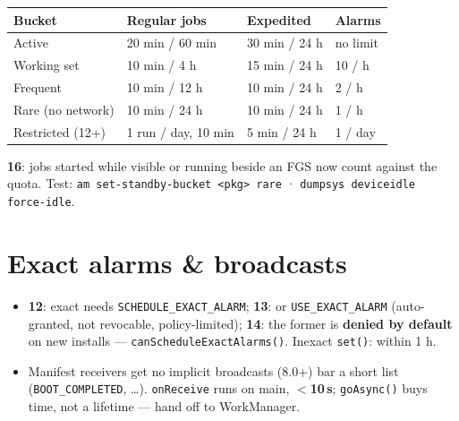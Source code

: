 \documentclass[8pt]{extarticle}
\begin{document}
\begin{multicols}{2}
{\scriptsize\noindent\begin{tabularx}{\linewidth}{@{}lLLl@{}}
\toprule
\textbf{Bucket} & \textbf{Regular jobs} & \textbf{Expedited} & \textbf{Alarms} \\
\midrule
Active & 20 min / 60 min & 30 min / 24 h & no limit \\
Working set & 10 min / 4 h & 15 min / 24 h & 10 / h \\
Frequent & 10 min / 12 h & 10 min / 24 h & 2 / h \\
Rare (no network) & 10 min / 24 h & 10 min / 24 h & 1 / h \\
Restricted (12+) & 1 run / day, 10 min & 5 min / 24 h & 1 / day \\
\bottomrule
\end{tabularx}}
\textbf{16}: jobs started while visible or running beside an FGS now count against the quota.
Test: \texttt{am set-standby-bucket <pkg> rare} · \texttt{dumpsys deviceidle force-idle}.

\section{Exact alarms \& broadcasts}
\begin{itemize}\raggedright
  \item \textbf{12}: exact needs \texttt{SCHEDULE\_EXACT\_ALARM}; \textbf{13}: or
        \texttt{USE\_EXACT\_ALARM} (auto-granted, not revocable, policy-limited); \textbf{14}: the
        former is \textbf{denied by default} on new installs — \texttt{canScheduleExactAlarms()}.
        Inexact \texttt{set()}: within 1 h.
  \item Manifest receivers get no implicit broadcasts (8.0+) bar a short list
        (\texttt{BOOT\_COMPLETED}, …). \texttt{onReceive} runs on main, $<$\textbf{10\,s};
        \texttt{goAsync()} buys time, not a lifetime — hand off to WorkManager.
\end{itemize}


\end{multicols}

\end{document}
